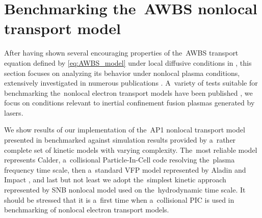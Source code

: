 \section{Benchmarking the~AWBS nonlocal transport model}
\label{sec:BenchmarkingAWBS}
After having shown several encouraging properties of the~AWBS transport 
equation defined by \eqref{eq:AWBS_model} under local diffusive conditions
in , this section focuses on analyzing 
its behavior under nonlocal plasma conditions, extensively investigated 
in numerous publications 
\cite{Malone_1975_15, Colombant_PoP2005, Bell_1981_83, LMV_1983_7, Brantov_Nonlocal_electron_transport_1998, schurtz2000, Sorbo_2015}.
A~variety of tests suitable for benchmarking the~nonlocal electron 
transport models have been published 
\cite{Epperlein_PoFB1991, marocchino2013, Sorbo_2015, 
Sorbo_2016, Sherlock_PoP2017, Brodrick_PoP2017}, we focus on 
conditions relevant to inertial confinement fusion plasmas generated by lasers.

We show results of our implementation of the~AP1 nonlocal transport model 
presented in  benchmarked against simulation results 
provided by a~rather complete set of kinetic models with varying complexity. 
The~most reliable model represents Calder, a~collisional Particle-In-Cell
code resolving the~plasma frequency time scale, then a~standard VFP model
represented by Aladin and Impact \cite{Kingham_JCP2004}, 
and last but not least we adopt the~simplest kinetic approach represented by
SNB nonlocal model \cite{Schurtz_2000} used on the~hydrodynamic time scale. 
It should be stressed that it is a~first time when a~collisional PIC is used
in benchmarking of nonlocal electron transport models. 


